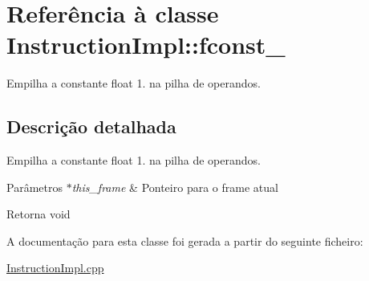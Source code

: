 \hypertarget{class_instruction_impl_1_1fconst__1}{}\section{Referência à classe Instruction\+Impl\+:\+:fconst\+\_}
\label{class_instruction_impl_1_1fconst__1}


Empilha a constante float 1. na pilha de operandos.  




\subsection{Descrição detalhada}
Empilha a constante float 1. na pilha de operandos. 


\begin{DoxyParams}{Parâmetros}
{\em $\ast$this\+\_\+frame} & Ponteiro para o frame atual \\
\hline
\end{DoxyParams}
\begin{DoxyReturn}{Retorna}
void 
\end{DoxyReturn}


A documentação para esta classe foi gerada a partir do seguinte ficheiro\+:\begin{DoxyCompactItemize}
\item 
\hyperlink{_instruction_impl_8cpp}{Instruction\+Impl.\+cpp}\end{DoxyCompactItemize}
